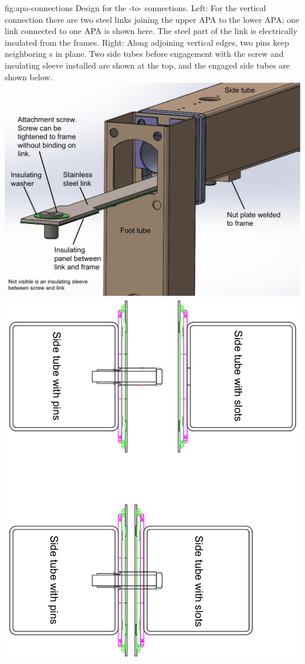 \begin{dunefigure}{fig:apa-connections}
{Design for the -to- connections.  Left: For the vertical connection there are two steel links joining the upper APA to the lower APA; one link connected to one APA is shown here.  The steel part of the link is electrically insulated from the frames.  Right: Along adjoining vertical edges, two pins keep neighboring s in plane. Two side tubes before engagement with the screw and insulating sleeve installed are shown at the top, and the engaged side tubes are shown below.}  
\includegraphics[height=0.29\textheight]{graphics/sp-apa-apa-mating-2.png} \qquad
\includegraphics[height=0.3\textheight]{graphics/sp-apa-side-mating-2.png}
\end{dunefigure}


